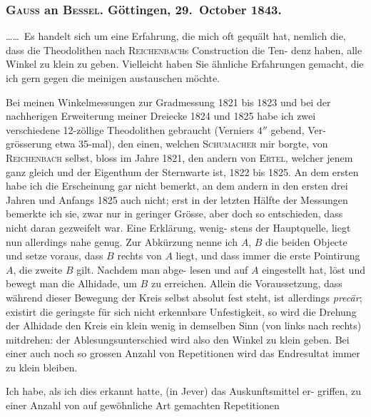 \documentclass[12pt,a4paper]{article}
\theoremstyle{plain}
\theoremstyle{definition}
\theoremstyle{remark}
\begin{document}
\subsubsection*{\textsc{Gauss} an \textsc{Bessel}. Göttingen, 29.\ October 1843.}

\ldots\ldots\ Es handelt sich um eine Erfahrung, die mich oft gequält hat,
nemlich die, dass die Theodolithen nach \textsc{Reichenbach}s Construction die Ten-
denz haben, alle Winkel zu klein zu geben. Vielleicht haben Sie ähnliche
Erfahrungen gemacht, die ich gern gegen die meinigen austauschen möchte.

Bei meinen Winkelmessungen zur Gradmessung 1821 bis 1823 und bei
der nachherigen Erweiterung meiner Dreiecke 1824 und 1825 habe ich zwei
verschiedene 12-zöllige Theodolithen gebraucht (Verniers $4''$ gebend, Ver-
grösserung etwa 35-mal), den einen, welchen \textsc{Schumacher} mir borgte, von
\textsc{Reichenbach} selbst, bloss im Jahre 1821, den andern von \textsc{Ertel}, welcher
jenem ganz gleich und der Eigenthum der Sternwarte ist, 1822 bis 1825. An
dem ersten habe ich die Erscheinung gar nicht bemerkt, an dem andern in
den ersten drei Jahren und Anfangs 1825 auch nicht; erst in der letzten
Hälfte der Messungen bemerkte ich sie, zwar nur in geringer Grösse, aber
doch so entschieden, dass nicht daran gezweifelt war. Eine Erklärung, wenig-
stens der Hauptquelle, liegt nun allerdings nahe genug. Zur Abkürzung nenne
ich $A$, $B$ die beiden Objecte und setze voraus, dass $B$ rechts von $A$ liegt, und
dass immer die erste Pointirung $A$, die zweite $B$ gilt. Nachdem man abge-
lesen und auf $A$ eingestellt hat, löst und bewegt man die Alhidade, um $B$
zu erreichen. Allein die Voraussetzung, dass während dieser Bewegung der
Kreis selbst absolut fest steht, ist allerdings \textit{precär}; existirt die geringste
für sich nicht erkennbare Unfestigkeit, so wird die Drehung der Alhidade den
Kreis ein klein wenig in demselben Sinn (von links nach rechts) mitdrehen:
der Ablesungsunterschied wird also den Winkel zu klein geben. Bei einer
auch noch so grossen Anzahl von Repetitionen wird das Endresultat immer
zu klein bleiben.

Ich habe, als ich dies erkannt hatte, (in Jever) das Auskunftsmittel er-
griffen, zu einer Anzahl von auf gewöhnliche Art gemachten Repetitionen
\end{document}
